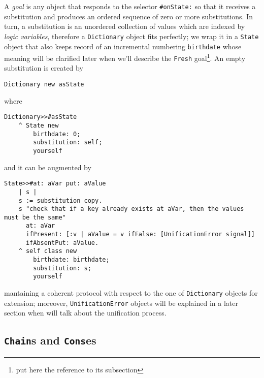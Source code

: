 \documentclass[a4paper,12pt]{article}
\begin{document}
A \textit{goal} is any object that responds to the selector \Verb|#onState:| so
that it receives a substitution and produces an ordered sequence of zero or
more substitutions. In turn, a substitution is an unordered collection of
values which are indexed by \textit{logic variables}, therefore a
\Verb|Dictionary| object fits perfectly; we wrap it in a \Verb|State| object
that also keeps record of an incremental numbering \Verb|birthdate| whose
meaning will be clarified later when we'll describe the \Verb|Fresh|
goal\footnote{put here the reference to its subsection}. An empty substitution
is created by
\begin{verbatim}
Dictionary new asState
\end{verbatim}
where
\begin{verbatim}
Dictionary>>#asState
    ^ State new
        birthdate: 0;
        substitution: self;
        yourself
\end{verbatim}
and it can be augmented by
\begin{verbatim}
State>>#at: aVar put: aValue
    | s |
    s := substitution copy.
    s "check that if a key already exists at aVar, then the values must be the same"
      at: aVar
      ifPresent: [:v | aValue = v ifFalse: [UnificationError signal]]
      ifAbsentPut: aValue.
    ^ self class new
        birthdate: birthdate;
        substitution: s;
        yourself
\end{verbatim}
mantaining a coherent protocol with respect to the one of \Verb|Dictionary|
objects for extension; moreover, \Verb|UnificationError| objects will be
explained in a later section when will talk about the unification process.

\subsection{\texttt{Chain}s and \texttt{Cons}es}
\end{document}
